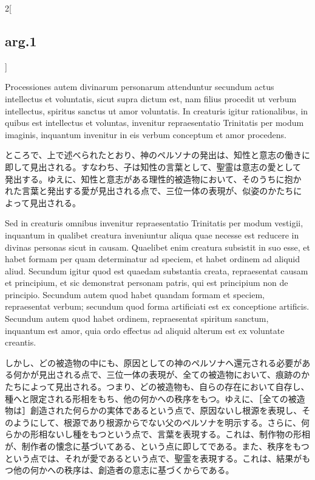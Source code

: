 \documentclass[paper=a4paper,fontsize=10pt,jafontsize=9pt,titlepage]{jlreq}
\begin{document}
\begin{paracol}{2}[\subsection{arg.1}]
\switchcolumn*

Processiones autem divinarum personarum
 attenduntur secundum actus intellectus et voluntatis, sicut supra
 dictum est, nam filius procedit ut verbum intellectus, spiritus sanctus
 ut amor voluntatis. In creaturis igitur rationalibus, in quibus est
 intellectus et voluntas, invenitur repraesentatio Trinitatis per modum
 imaginis, inquantum invenitur in eis verbum conceptum et amor
 procedens.

\switchcolumn

ところで、上で述べられたとおり、神のペルソナの発出は、知性と意志の働きに
 即して見出される。すなわち、子は知性の言葉として、聖霊は意志の愛として
 発出する。ゆえに、知性と意志がある理性的被造物において、そのうちに抱か
 れた言葉と発出する愛が見出される点で、三位一体の表現が、似姿のかたちに
 よって見出される。

\switchcolumn*

Sed in creaturis omnibus invenitur repraesentatio Trinitatis
 per modum vestigii, inquantum in qualibet creatura inveniuntur aliqua
 quae necesse est reducere in divinas personas sicut in
 causam. Quaelibet enim creatura subsistit in suo esse, et habet formam
 per quam determinatur ad speciem, et habet ordinem ad aliquid
 aliud. Secundum igitur quod est quaedam substantia creata, repraesentat
 causam et principium, et sic demonstrat personam patris, qui est
 principium non de principio. Secundum autem quod habet quandam formam
 et speciem, repraesentat verbum; secundum quod forma artificiati est ex
 conceptione artificis. Secundum autem quod habet ordinem, repraesentat
 spiritum sanctum, inquantum est amor, quia ordo effectus ad aliquid
 alterum est ex voluntate creantis.

\switchcolumn

しかし、どの被造物の中にも、原因としての神のペルソナへ還元される必要があ
 る何かが見出される点で、三位一体の表現が、全ての被造物において、痕跡のか
 たちによって見出される。つまり、どの被造物も、自らの存在において自存し、
 種へと限定される形相をもち、他の何かへの秩序をもつ。ゆえに、［全ての被造
 物は］創造された何らかの実体であるという点で、原因ないし根源を表現し、そ
 のようにして、根源であり根源からでない父のペルソナを明示する。さらに、何
 らかの形相ないし種をもつという点で、言葉を表現する。これは、制作物の形相
 が、制作者の懐念に基づいてある、という点に即してである。また、秩序をもつ
 という点では、それが愛であるという点で、聖霊を表現する。これは、結果がも
 つ他の何かへの秩序は、創造者の意志に基づくからである。

\switchcolumn*


\end{paracol}
\end{document}
